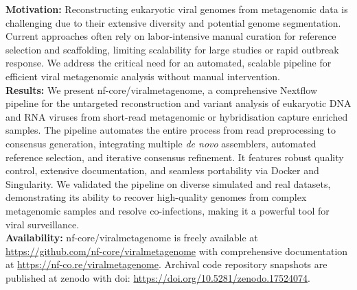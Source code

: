 \textbf{Motivation:}  Reconstructing eukaryotic viral genomes from metagenomic data is challenging due to their extensive diversity and potential genome segmentation. Current approaches often rely on labor-intensive manual curation for reference selection and scaffolding, limiting scalability for large studies or rapid outbreak response. We address the critical need for an automated, scalable pipeline for efficient viral metagenomic analysis without manual intervention.  \\
\textbf{Results:} We present nf-core/viralmetagenome, a comprehensive Nextflow pipeline for the untargeted reconstruction and variant analysis of eukaryotic DNA and RNA viruses from short-read metagenomic or hybridisation capture enriched samples. The pipeline automates the entire process from read preprocessing to consensus generation, integrating multiple \textit{de novo} assemblers, automated reference selection, and iterative consensus refinement. It features robust quality control, extensive documentation, and seamless portability via Docker and Singularity. We validated the pipeline on diverse simulated and real datasets, demonstrating its ability to recover high-quality genomes from complex metagenomic samples and resolve co-infections, making it a powerful tool for viral surveillance.\\
\textbf{Availability:} nf-core/viralmetagenome is freely available at \href{https://github.com/nf-core/viralmetagenome}{https://github.com/nf-core/viralmetagenome} with comprehensive documentation at \href{https://nf-co.re/viralmetagenome}{https://nf-co.re/viralmetagenome}. Archival code repository snapshots are published at zenodo with doi: \href{https://doi.org/10.5281/zenodo.17524074}{https://doi.org/10.5281/zenodo.17524074}.\\
